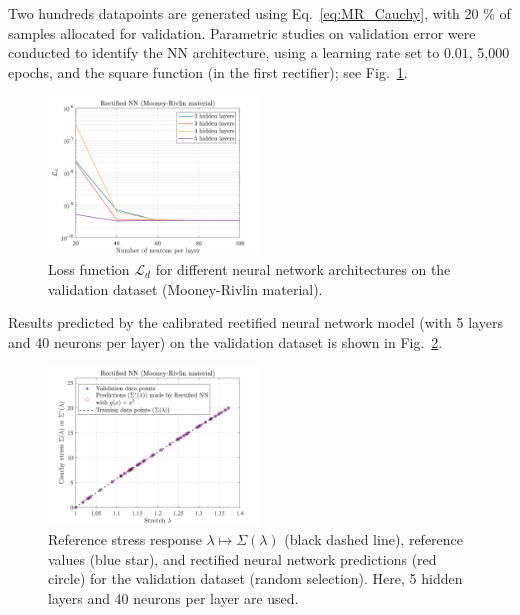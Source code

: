Two hundreds datapoints are generated using Eq.~\eqref{eq:MR_Cauchy}, with 20 \% of samples allocated for validation.  Parametric studies on validation error were conducted to identify the NN architecture, using a learning rate set to $0.01$, 5,000 epochs, and the square function (in the first rectifier); see Fig.~\ref{fig:Mr_Err_Study}.
\begin{figure}[ht!]
    \begin{center}
        \includegraphics[width = 0.5\textwidth]{Pictures/Mr_Err.png}
    \end{center}
    \caption{Loss function $\mathcal{L}_d$ for different neural network architectures on the validation dataset (Mooney-Rivlin material).}
    \label{fig:Mr_Err_Study} 
\end{figure}
Results predicted by the calibrated rectified neural network model (with 5 layers and 40 neurons per layer) on the validation dataset is shown in Fig.~\ref{fig:MR best result 1}.
\begin{figure}[ht!]
    \begin{center}
\includegraphics[width=0.5\textwidth]{Pictures/sigma_MR.png}
    \end{center}
    \caption{Reference stress response $\lambda \mapsto \Sigma(\lambda)$ (black dashed line), reference values (blue star), and rectified neural network predictions (red circle) for the validation dataset (random selection). Here, 5 hidden layers and 40 neurons per layer are used.}
    \label{fig:MR best result 1}
\end{figure}

